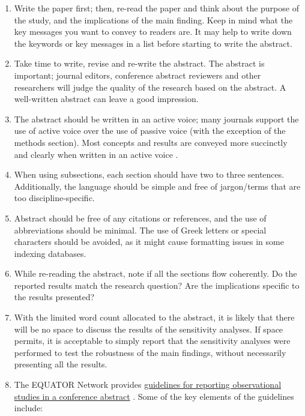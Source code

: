 \documentclass[
]{book}
\begin{document}
\begin{enumerate}
\def\labelenumi{\arabic{enumi}.}
\item
  Write the paper first; then, re-read the paper and think about the purpose of the study, and the implications of the main finding. Keep in mind what the key messages you want to convey to readers are. It may help to write down the keywords or key messages in a list before starting to write the abstract.
\item
  Take time to write, revise and re-write the abstract. The abstract is important; journal editors, conference abstract reviewers and other researchers will judge the quality of the research based on the abstract. A well-written abstract can leave a good impression.
\item
  The abstract should be written in an active voice; many journals support the use of active voice over the use of passive voice (with the exception of the methods section). Most concepts and results are conveyed more succinctly and clearly when written in an active voice \citep{nature2021portfolio, thebmj2021authors}.
\item
  When using subsections, each section should have two to three sentences. Additionally, the language should be simple and free of jargon/terms that are too discipline-specific.
\item
  Abstract should be free of any citations or references, and the use of abbreviations should be minimal. The use of Greek letters or special characters should be avoided, as it might cause formatting issues in some indexing databases.
\item
  While re-reading the abstract, note if all the sections flow coherently. Do the reported results match the research question? Are the implications specific to the results presented?
\item
  With the limited word count allocated to the abstract, it is likely that there will be no space to discuss the results of the sensitivity analyses. If space permits, it is acceptable to simply report that the sensitivity analyses were performed to test the robustness of the main findings, without necessarily presenting all the results.
\item
  The EQUATOR Network provides \href{https://www.strobe-statement.org/download/strobe-checklist-conference-abstracts}{guidelines for reporting observational studies in a conference abstract} \citep{strobe2021abstract}. Some of the key elements of the guidelines include:


\end{enumerate}
\end{document}

